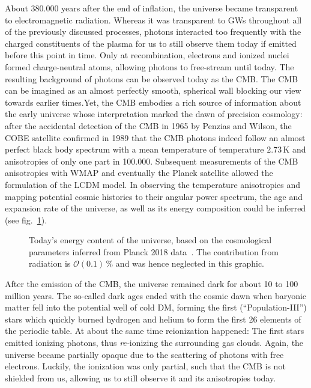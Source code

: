 About 380.000 years after the end of inflation, the universe became transparent to electromagnetic radiation. Whereas it was transparent to \acp{GW} throughout all of the previously discussed processes, photons interacted too frequently with the charged constituents of the plasma for us to still observe them today if emitted before this point in time. Only at recombination, electrons and ionized nuclei formed charge-neutral atoms, allowing photons to free-stream until today.   The resulting background of photons can be observed today as the \ac{CMB}. The \ac{CMB} can be imagined as an almost perfectly smooth, spherical wall blocking our view towards earlier times.Yet, the \ac{CMB} embodies a rich source of information about the early universe whose interpretation marked the dawn of precision cosmology: after the accidental detection of the \ac{CMB} in 1965 by Penzias and Wilson, the COBE satellite confirmed in 1989 that the \ac{CMB} photons indeed follow an almost perfect black body spectrum with a mean temperature of temperature $2.73 \, \text{K}$ and anisotropies of only one part in 100.000. Subsequent measurements of the \ac{CMB} anisotropies with WMAP and eventually the Planck satellite allowed the formulation of the \ac{LCDM} model. In observing the temperature anisotropies and mapping potential cosmic histories to their angular power spectrum, the age and expansion rate of the universe, as well as its energy composition could be inferred (see fig.~\ref{fig:mattercontenttoday}).

\begin{figure}[t]
	\centering
	\caption{Today's energy content of the universe, based on the cosmological parameters inferred from Planck 2018 data~\cite{Planck:2018vyg}. The contribution from radiation is $\mathcal{O}(0.1) \, \%$ and was hence neglected in this graphic.}
	\label{fig:mattercontenttoday}
\end{figure}

After the emission of the \ac{CMB}, the universe remained dark for about 10 to 100 million years. The so-called dark ages ended with the cosmic dawn when baryonic matter fell into the potential well of cold \ac{DM}, forming the first (``Population-III'') stars which quickly burned hydrogen and helium to form the first 26 elements of the periodic table. At about the same time reionization  happened: The first stars emitted ionizing photons, thus \textit{re-}ionizing the surrounding gas clouds. Again, the universe became partially opaque due to the scattering of photons with free electrons. Luckily, the ionization was only partial, such that the CMB is not shielded from us, allowing us to still observe it and its anisotropies today.


